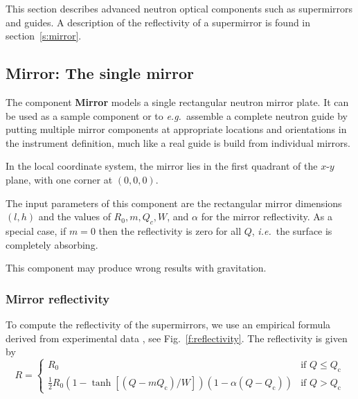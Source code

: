 

This section describes advanced neutron optical
components such as supermirrors and guides.
A description of the reflectivity of a supermirror is found
in section~\ref{s:mirror}.

\subsection*{Mirror: The single mirror}
\label{s:mirror}

The component \textbf{Mirror}
models a single rectangular neutron mirror plate. It can be used
as a sample component or to \textit{e.g.}~assemble a complete neutron guide by putting multiple
mirror components at appropriate locations and orientations in the
instrument definition, much like a real guide is build from individual
mirrors.

In the local coordinate system, the mirror lies in the first quadrant of the
$x$-$y$ plane, with one corner at $(0,0,0)$.

The input parameters of this component are
the rectangular mirror dimensions $(l, h)$
and the values of $R_0, m, Q_c, W$, and $\alpha$ for the mirror reflectivity.
As a special case, if $m=0$ then the reflectivity is zero for all $Q$,
\textit{i.e.}\ the surface is completely absorbing.

This component may produce wrong results with gravitation.

\subsubsection{Mirror reflectivity}
\label{ss:mirrorreflect}
To compute the reflectivity of the supermirrors, we use an empirical
formula derived from experimental data \cite{pb_241_50},
see Fig.~\ref{f:reflectivity}. The reflectivity is given by
\begin{equation} \label{e:Rmirror}
  R = \left\{
    \begin{array}{ll}
      R_0 & \textrm{if $Q \leq Q_\textrm{c}$} \\
      \frac{1}{2}R_0(1 - \tanh[(Q - m Q_\textrm{c})/W])(1-\alpha(Q-Q_\textrm{c}))
         & \textrm{if $Q > Q_\textrm{c}$}
    \end{array}
  \right.
\end{equation}

